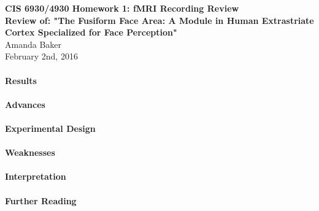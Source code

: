 \documentclass[11pt]{article}
\begin{document}
\begin{center}
{\large {\bf CIS 6930/4930 Homework 1: fMRI Recording Review}}\\
{\normalsize {\bf Review of: "The Fusiform Face Area: A Module in Human Extrastriate Cortex
Specialized for Face Perception"}}\\
Amanda Baker \\
February 2nd, 2016 \\
\end{center}

\paragraph{Results}


\paragraph{Advances}


\paragraph{Experimental Design}


\paragraph{Weaknesses}


\paragraph{Interpretation}


\paragraph{Further Reading}
\end{document}
